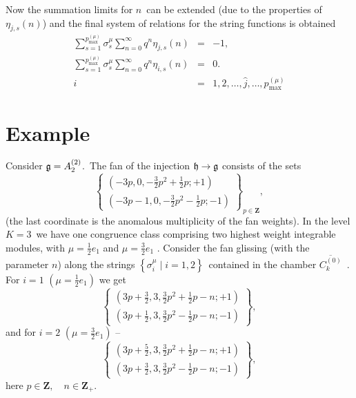 \documentclass{article}
\begin{document}
Now the summation limits for $n$\ can be extended (due to the properties of $%
\eta _{j,s}\left( n\right) $) and the final system of relations for the
string functions is obtained
\begin{eqnarray*}
\sum_{s=1}^{p_{\max }^{\left( \mu \right) }}\sigma _{s}^{\mu
}\sum_{n=0}^{\infty }q^{n}\eta _{j,s}\left( n\right) &=&-1, \\
\sum_{s=1}^{p_{\max }^{\left( \mu \right) }}\sigma _{s}^{\mu
}\sum_{n=0}^{\infty }q^{n}\eta _{i,s}\left( n\right) &=&0. \\
i &=&1,2,\ldots ,\widehat{j},\ldots ,p_{\max }^{\left( \mu \right) }
\end{eqnarray*}

\section{Example}

Consider $\frak{g}=A_{2}^{\left( 2\right) }$.\ The fan of the injection $%
\frak{h}\rightarrow \frak{g}$ consists of the sets
\begin{equation*}
\left\{
\begin{array}{c}
\left( -3p,0,-\frac{3}{2}p^{2}+\frac{1}{2}p;+1\right) \\
\left( -3p-1,0,-\frac{3}{2}p^{2}-\frac{1}{2}p;-1\right)
\end{array}
\right\} _{p\in \mathbf{Z}},
\end{equation*}
(the last coordinate is the anomalous multiplicity of the fan weights). In
the level $K=3$\ we have one congruence class comprising two highest weight
integrable modules, with $\mu =\frac{1}{2}e_{1}$ and $\mu =\frac{3}{2}e_{1}$%
. Consider the fan glissing (with the parameter $n$) along the strings $%
\left\{ \sigma _{i}^{\mu }\mid i=1,2\right\} $\ contained in the chamber $%
\overline{C_{k}^{\left( 0\right) }}$\ . For $i=1$ $\left( \mu =\frac{1}{2}%
e_{1}\right) $ we get
\begin{equation*}
\left\{
\begin{array}{c}
\left( 3p+\frac{3}{2},3,\frac{3}{2}p^{2}+\frac{1}{2}p-n;+1\right) \\
\left( 3p+\frac{1}{2},3,\frac{3}{2}p^{2}-\frac{1}{2}p-n;-1\right)
\end{array}
\right\} ,
\end{equation*}
and for $i=2$ $\left( \mu =\frac{3}{2}e_{1}\right) $ --
\begin{equation*}
\left\{
\begin{array}{c}
\left( 3p+\frac{5}{2},3,\frac{3}{2}p^{2}+\frac{1}{2}p-n;+1\right) \\
\left( 3p+\frac{3}{2},3,\frac{3}{2}p^{2}-\frac{1}{2}p-n;-1\right)
\end{array}
\right\} ,
\end{equation*}
here $p\in \mathbf{Z,\quad }n\in \mathbf{Z}_{+}\mathbf{.}$\
\end{document}
